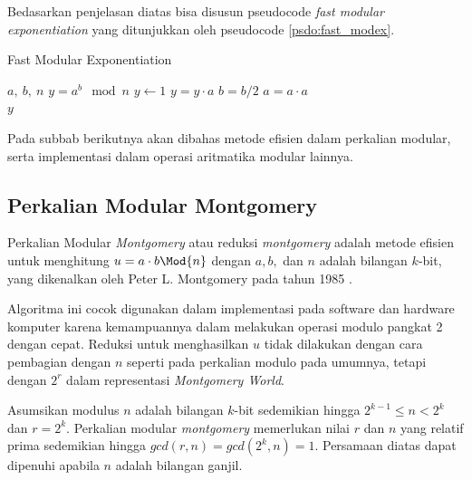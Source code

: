 Bedasarkan penjelasan diatas bisa disusun pseudocode \textit{fast modular exponentiation} yang ditunjukkan oleh pseudocode \ref{psdo:fast_modex}.

\begin{algorithm}
	\caption{Fast Modular Exponentiation}
	\label{psdo:fast_modex}
	\begin{algorithmic}[1]
		\Require $a,\ b,\ n$
		\Ensure $y = a^b\mod{n}$
		\State $y \leftarrow 1$
				\State $ y = y \cdot a $
			\EndIf
			\State $ b = b / 2 $
			\State $ a = a \cdot a $
		\EndWhile \\
		\Return $ y $
	\end{algorithmic}
\end{algorithm}

Pada subbab berikutnya akan dibahas metode efisien dalam perkalian modular, serta implementasi dalam operasi aritmatika modular lainnya.

\subsection{ Perkalian Modular Montgomery}
Perkalian Modular \textit{Montgomery} atau reduksi \textit{montgomery} adalah metode efisien untuk menghitung $ u = a \cdot b \Mod{n} $ dengan $ a, b, $ dan $ n $ adalah  bilangan $k$-bit, yang dikenalkan oleh Peter L. Montgomery pada tahun 1985 \cite{montgomery}. 

Algoritma ini cocok digunakan dalam implementasi pada software dan hardware komputer karena kemampuannya dalam melakukan operasi modulo pangkat 2 dengan cepat. Reduksi untuk menghasilkan $ u $ tidak dilakukan dengan cara pembagian dengan $ n $ seperti pada perkalian modulo pada umumnya, tetapi dengan $ 2^r $ dalam representasi \textit{Montgomery World}.

Asumsikan modulus $ n $ adalah bilangan $k$-bit sedemikian hingga $ 2^{k-1} \leq n < 2^{k} $ dan $ r = 2^{k}$. Perkalian modular \textit{montgomery} memerlukan nilai $ r $ dan $ n $ yang relatif prima sedemikian hingga $ gcd(r, n) = gcd(2^k, n) = 1 $. Persamaan diatas dapat dipenuhi apabila $ n $ adalah bilangan ganjil.

